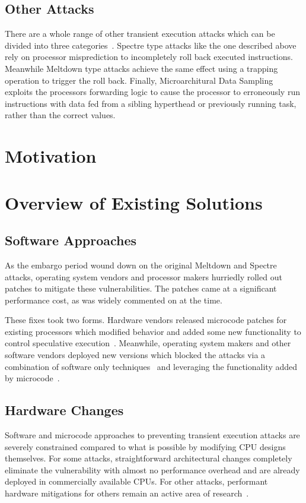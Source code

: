 \subsection*{Other Attacks}
There are a whole range of other transient execution attacks which can be divided into three categories~\cite{hill:survey}.
Spectre type attacks like the one described above rely on processor misprediction to incompletely roll back executed instructions.
Meanwhile Meltdown type attacks achieve the same effect using a trapping operation to trigger the roll back.
Finally, Microarchitural Data Sampling exploits the processors forwarding logic to cause the processor to erroneously run instructions with data fed from a sibling hyperthead or previously running task, rather than the correct values.

\section*{Motivation}


\section*{Overview of Existing Solutions}
\subsection*{Software Approaches}
As the embargo period wound down on the original Meltdown and Spectre attacks, operating system vendors and processor makers hurriedly rolled out patches to mitigate these vulnerabilities.
The patches came at a significant performance cost, as was widely commented on at the time. 

These fixes took two forms.
Hardware vendors released microcode patches for existing processors which modified behavior and added some new functionality to control speculative execution~\cite{intel:l1tf}.
Meanwhile, operating system makers and other software vendors deployed new versions which blocked the attacks via a combination of software only techniques~\cite{intel:retpoline, linux:kpti} and leveraging the functionality added by microcode~\cite{intel:l1tf}.

\subsection*{Hardware Changes}
Software and microcode approaches to preventing transient execution attacks are severely constrained compared to what is possible by modifying CPU designs themselves.
For some attacks, straightforward architectural changes completely eliminate the vulnerability with almost no performance overhead and are already deployed in commercially available CPUs.
For other attacks, performant hardware mitigations for others remain an active area of research~\cite{OISA, ConTExT}.

